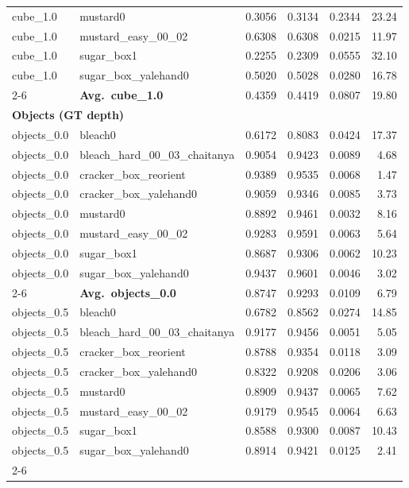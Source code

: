 \begin{longtable}{llrrrr}
  cube_1.0 & mustard0 & 0.3056 & 0.3134 & 0.2344 & 23.24 \\
  cube_1.0 & mustard\_easy\_00\_02 & 0.6308 & 0.6308 & 0.0215 & 11.97 \\
  cube_1.0 & sugar\_box1 & 0.2255 & 0.2309 & 0.0555 & 32.10 \\
  cube_1.0 & sugar\_box\_yalehand0 & 0.5020 & 0.5028 & 0.0280 & 16.78 \\
  \cmidrule{2-6}
  & \textbf{Avg.~cube_1.0} & 0.4359 & 0.4419 & 0.0807 & 19.80 \\
  \midrule
\multicolumn{6}{l}{\textbf{Objects (GT depth)}} \\
\midrule
  objects_0.0 & bleach0 & 0.6172 & 0.8083 & 0.0424 & 17.37 \\
  objects_0.0 & bleach\_hard\_00\_03\_chaitanya & 0.9054 & 0.9423 & 0.0089 & 4.68 \\
  objects_0.0 & cracker\_box\_reorient & 0.9389 & 0.9535 & 0.0068 & 1.47 \\
  objects_0.0 & cracker\_box\_yalehand0 & 0.9059 & 0.9346 & 0.0085 & 3.73 \\
  objects_0.0 & mustard0 & 0.8892 & 0.9461 & 0.0032 & 8.16 \\
  objects_0.0 & mustard\_easy\_00\_02 & 0.9283 & 0.9591 & 0.0063 & 5.64 \\
  objects_0.0 & sugar\_box1 & 0.8687 & 0.9306 & 0.0062 & 10.23 \\
  objects_0.0 & sugar\_box\_yalehand0 & 0.9437 & 0.9601 & 0.0046 & 3.02 \\
  \cmidrule{2-6}
  & \textbf{Avg.~objects_0.0} & 0.8747 & 0.9293 & 0.0109 & 6.79 \\
  \midrule
  objects_0.5 & bleach0 & 0.6782 & 0.8562 & 0.0274 & 14.85 \\
  objects_0.5 & bleach\_hard\_00\_03\_chaitanya & 0.9177 & 0.9456 & 0.0051 & 5.05 \\
  objects_0.5 & cracker\_box\_reorient & 0.8788 & 0.9354 & 0.0118 & 3.09 \\
  objects_0.5 & cracker\_box\_yalehand0 & 0.8322 & 0.9208 & 0.0206 & 3.06 \\
  objects_0.5 & mustard0 & 0.8909 & 0.9437 & 0.0065 & 7.62 \\
  objects_0.5 & mustard\_easy\_00\_02 & 0.9179 & 0.9545 & 0.0064 & 6.63 \\
  objects_0.5 & sugar\_box1 & 0.8588 & 0.9300 & 0.0087 & 10.43 \\
  objects_0.5 & sugar\_box\_yalehand0 & 0.8914 & 0.9421 & 0.0125 & 2.41 \\
  \cmidrule{2-6}

\end{longtable}

